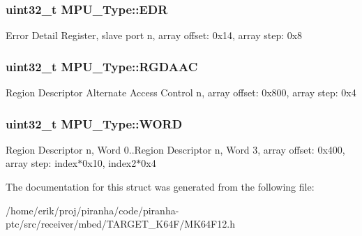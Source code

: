 \subsubsection[{\texorpdfstring{E\+DR}{EDR}}]{ uint32\+\_\+t M\+P\+U\+\_\+\+Type\+::\+E\+DR}\hypertarget{structMPU__Type_a3adbf6d9dac1f29825896fa67d40a4ef}{}\label{structMPU__Type_a3adbf6d9dac1f29825896fa67d40a4ef}
Error Detail Register, slave port n, array offset\+: 0x14, array step\+: 0x8 
\subsubsection[{\texorpdfstring{R\+G\+D\+A\+AC}{RGDAAC}}]{ uint32\+\_\+t M\+P\+U\+\_\+\+Type\+::\+R\+G\+D\+A\+AC}\hypertarget{structMPU__Type_aef0fd019f3b3fef54756a7df6cc61cd5}{}\label{structMPU__Type_aef0fd019f3b3fef54756a7df6cc61cd5}
Region Descriptor Alternate Access Control n, array offset\+: 0x800, array step\+: 0x4 
\subsubsection[{\texorpdfstring{W\+O\+RD}{WORD}}]{ uint32\+\_\+t M\+P\+U\+\_\+\+Type\+::\+W\+O\+RD}\hypertarget{structMPU__Type_a288c0fa35bf00f08891834e510832946}{}\label{structMPU__Type_a288c0fa35bf00f08891834e510832946}
Region Descriptor n, Word 0..Region Descriptor n, Word 3, array offset\+: 0x400, array step\+: index$\ast$0x10, index2$\ast$0x4 

The documentation for this struct was generated from the following file\+:\begin{DoxyCompactItemize}
\item 
/home/erik/proj/piranha/code/piranha-\/ptc/src/receiver/mbed/\+T\+A\+R\+G\+E\+T\+\_\+\+K64\+F/M\+K64\+F12.\+h\end{DoxyCompactItemize}
